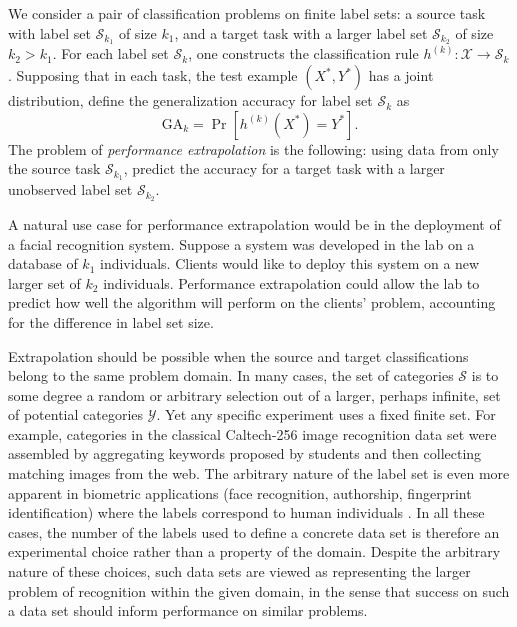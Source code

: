 \documentclass[twoside,11pt]{article}
\begin{document}
We consider a pair of classification problems on finite
label sets: a source task with label set $\mathcal{S}_{k_1}$ of size
$k_1$, and a target task with a larger label set $\mathcal{S}_{k_2}$
of size $k_2 > k_1$.  For each label set $\mathcal{S}_k$, one
constructs the classification rule $h^{(k)}:\mathcal{X} \to
\mathcal{S}_{k}$.  Supposing that in each task, the test example
$(X^*, Y^*)$ has a joint distribution, define the generalization
accuracy for label set $\mathcal{S}_k$ as
\begin{equation}\label{eq:ga_k}
\text{GA}_k = \Pr[h^{(k)}(X^*) = Y^*].
\end{equation}
The problem of \emph{performance extrapolation} is the following:
using data from only the source task $\mathcal{S}_{k_1}$, 
predict the accuracy for a target task with a larger unobserved 
label set $\mathcal{S}_{k_2}$.

A natural use case for performance extrapolation would be in the
deployment of a facial recognition system.  Suppose a system was
developed in the lab on a database of $k_1$ individuals. Clients would
like to deploy this system on a new larger set of $k_2$
individuals. Performance extrapolation could allow the lab to predict
how well the algorithm will perform on the clients' problem,
accounting for the difference in label set size.

Extrapolation should be possible when the source and target
classifications belong to the same problem domain.  In
many cases, the set of categories $\mathcal{S}$ is to some degree a
random or arbitrary selection out of a larger, perhaps infinite, set
of potential categories $\mathcal{Y}$. Yet any specific experiment
uses a fixed finite set.  For example, categories in the classical
Caltech-256 image recognition data set \citep{griffin2007caltech} were
assembled by aggregating keywords proposed by students and then
collecting matching images from the web.  The arbitrary nature of the
label set is even more apparent in biometric applications (face
recognition, authorship, fingerprint identification) where the labels
correspond to human individuals \citep{togneri2011overview,
  stamatatos2014overview}.  In all these cases, the number of the
labels used to define a concrete data set is therefore an experimental
choice rather than a property of the domain.  Despite the arbitrary
nature of these choices, such data sets are viewed as representing the
larger problem of recognition within the given domain, in the sense
that success on such a data set should inform performance on similar
problems.
\end{document}
